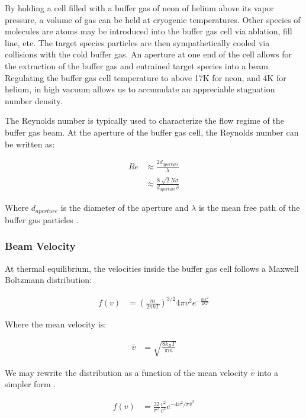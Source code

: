 \documentclass[a4paper]{article}
\begin{document}
By holding a cell filled with a buffer gas of neon of helium above its vapor pressure, a volume of gas can be held at cryogenic temperatures. Other species of molecules are atoms may be introduced into the buffer gas cell via ablation, fill line, etc. The target species particles are then sympathetically cooled via collisions with the cold buffer gas. An aperture at one end of the cell allows for the extraction of the buffer gas and entrained target species into a beam. Regulating the buffer gas cell temperature to above 17K for neon, and 4K for helium, in high vacuum allows us to accumulate an appreciable stagnation number density.

The Reynolds number is typically used to characterize the flow regime of the buffer gas beam. At the aperture of the buffer gas cell, the Reynolds number can be written as:

\begin{align} \label{e: reynolds}
Re & \approx \frac{2 d_{aperture}}{\lambda} \\
& \approx \frac{8\sqrt[]{2} \dot{N} \sigma}{d_{aperture} \bar{v}}
\end{align}

Where $d_{aperture}$ is the diameter of the aperture and $\lambda$ is the mean free path of the buffer gas particles \cite{Hutzler2012}.

\subsubsection{Beam Velocity}

At thermal equilibrium, the velocities inside the buffer gas cell follows a Maxwell Boltzmann distribution:

\begin{align} \label{e: mb_distribution}
f(v) & = \left(\frac{m}{2 \pi k T}\right)^{3/2}4 \pi v^2 e^{-\frac{m v^2}{2 k T}}
\end{align}

Where the mean velocity is:

\begin{align} \label{e: mb_mean}
\bar{v} & = \sqrt{\frac{8 k_B T}{\pi m}}
\end{align}

We may rewrite the distribution as a function of the mean velocity $\bar{v}$ into a simpler form .

\begin{align} \label{e: mb_simplified}
f(v) & = \frac{32}{\pi^2} \frac{v^2}{\bar{v}^3} e^{-4v^2/\pi \bar{v}^2}
\end{align}
\end{document}
